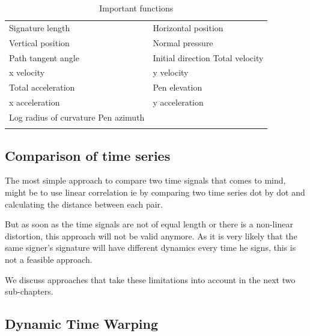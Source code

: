 \documentclass[a4paper, oneside]{csthesis}
\begin{document}
\begin{table}[tb]
    \caption{Important functions}
    \label{fig:figurename}
    \begin{center}
        \begin{tabular}{p{6cm}|p{6cm}}
        \hline
Signature length  & Horizontal position  \\ \hdashline[0.5pt/3pt]
Vertical position  & Normal pressure  \\ \hdashline[0.5pt/3pt]
Path tangent angle & Initial direction Total velocity \\ \hdashline[0.5pt/3pt]
x velocity & y velocity \\ \hdashline[0.5pt/3pt]
Total acceleration & Pen elevation \\ \hdashline[0.5pt/3pt]
x acceleration & y acceleration \\ \hdashline[0.5pt/3pt]
Log radius of curvature Pen azimuth & \\ \hdashline[0.5pt/3pt]
        \hline
        \end{tabular}
    \end{center}
\end{table}


\subsection{Comparison of time series}

The most simple approach to compare two time signals that comes to mind, might be to use linear correlation \cite{Plamondon1989107} ie by comparing two time series dot by dot and calculating the distance between each pair.

But as soon as the time signals are not of equal length or there is a non-linear distortion, this approach will not be valid anymore. As it is very likely that the same signer's signature will have different dynamics every time he signs, this is not a feasible approach.

We discuss approaches that take these limitations into account in the next two sub-chapters.





\subsection{Dynamic Time Warping}
\end{document}
